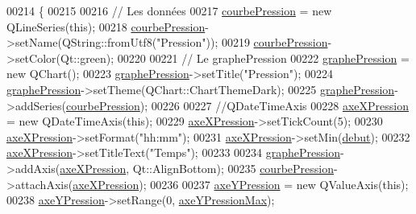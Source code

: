 \begin{DoxyCode}
00214 \{
00215 
00216     \textcolor{comment}{// Les données}
00217     \hyperlink{class_graphique_a49e03fd868685d638fc285837ca26772}{courbePression} = \textcolor{keyword}{new} QLineSeries(\textcolor{keyword}{this});
00218     \hyperlink{class_graphique_a49e03fd868685d638fc285837ca26772}{courbePression}->setName(QString::fromUtf8(\textcolor{stringliteral}{"Pression"}));
00219     \hyperlink{class_graphique_a49e03fd868685d638fc285837ca26772}{courbePression}->setColor(Qt::green);
00220 
00221     \textcolor{comment}{// Le graphePression}
00222     \hyperlink{class_graphique_afbf5d79803c4395cd5526891e1fc313f}{graphePression} = \textcolor{keyword}{new} QChart();
00223     \hyperlink{class_graphique_afbf5d79803c4395cd5526891e1fc313f}{graphePression}->setTitle(\textcolor{stringliteral}{"Pression"});
00224     \hyperlink{class_graphique_afbf5d79803c4395cd5526891e1fc313f}{graphePression}->setTheme(QChart::ChartThemeDark);
00225     \hyperlink{class_graphique_afbf5d79803c4395cd5526891e1fc313f}{graphePression}->addSeries(\hyperlink{class_graphique_a49e03fd868685d638fc285837ca26772}{courbePression});
00226 
00227     \textcolor{comment}{//QDateTimeAxis}
00228     \hyperlink{class_graphique_a343286de3f9c610257a140c1bf5c4755}{axeXPression} = \textcolor{keyword}{new} QDateTimeAxis(\textcolor{keyword}{this});
00229     \hyperlink{class_graphique_a343286de3f9c610257a140c1bf5c4755}{axeXPression}->setTickCount(5);
00230     \hyperlink{class_graphique_a343286de3f9c610257a140c1bf5c4755}{axeXPression}->setFormat(\textcolor{stringliteral}{"hh:mm"});
00231     \hyperlink{class_graphique_a343286de3f9c610257a140c1bf5c4755}{axeXPression}->setMin(\hyperlink{class_graphique_a468d57ae7b14b46558cf25629cced7b6}{debut});
00232     \hyperlink{class_graphique_a343286de3f9c610257a140c1bf5c4755}{axeXPression}->setTitleText(\textcolor{stringliteral}{"Temps"});
00233 
00234     \hyperlink{class_graphique_afbf5d79803c4395cd5526891e1fc313f}{graphePression}->addAxis(\hyperlink{class_graphique_a343286de3f9c610257a140c1bf5c4755}{axeXPression}, Qt::AlignBottom);
00235     \hyperlink{class_graphique_a49e03fd868685d638fc285837ca26772}{courbePression}->attachAxis(\hyperlink{class_graphique_a343286de3f9c610257a140c1bf5c4755}{axeXPression});
00236 
00237     \hyperlink{class_graphique_a9e5efb7607907c0428baa90bd6fbeb2e}{axeYPression} = \textcolor{keyword}{new} QValueAxis(\textcolor{keyword}{this});
00238     \hyperlink{class_graphique_a9e5efb7607907c0428baa90bd6fbeb2e}{axeYPression}->setRange(0, \hyperlink{class_graphique_a2d382f64898f7e768e612c43dba365de}{axeYPressionMax});

\end{DoxyCode}
